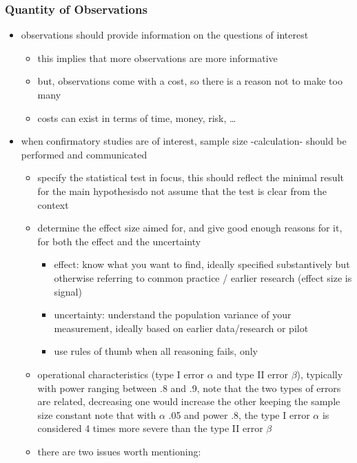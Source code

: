 \documentclass[]{article}
\providecommand{\tightlist}{%
  \setlength{\itemsep}{0pt}\setlength{\parskip}{0pt}}
\begin{document}
\subsubsection{Quantity of Observations}\label{quantity-of-observations}

\begin{itemize}
\tightlist
\item
  observations should provide information on the questions of interest

  \begin{itemize}
  \tightlist
  \item
    this implies that more observations are more informative
  \item
    but, observations come with a cost, so there is a reason not to make
    too many
  \item
    costs can exist in terms of time, money, risk, \ldots{} 
  \end{itemize}
\item
  when confirmatory studies are of interest, sample size -calculation-
  should be performed and communicated

  \begin{itemize}
  \tightlist
  \item
    specify the statistical test in focus, this should reflect the
    minimal result for the main hypothesisdo not assume that the test is
    clear from the context
  \item
    determine the effect size aimed for, and give good enough reasons
    for it, for both the effect and the uncertainty

    \begin{itemize}
    \tightlist
    \item
      effect: know what you want to find, ideally specified
      substantively but otherwise referring to common practice / earlier
      research (effect size is signal)
    \item
      uncertainty: understand the population variance of your
      measurement, ideally based on earlier data/research or pilot
    \item
      use rules of thumb when all reasoning fails, only
    \end{itemize}
  \item
    operational characteristics (type I error \(\alpha\) and type II
    error \(\beta\)), typically with power ranging between .8 and .9,
    note that the two types of errors are related, decreasing one would
    increase the other keeping the sample size constant note that with
    \(\alpha\) .05 and power .8, the type I error \(\alpha\) is
    considered 4 times more severe than the type II error \(\beta\) 
  \item
    there are two issues worth mentioning:


\end{itemize}
\end{itemize}
\end{document}
